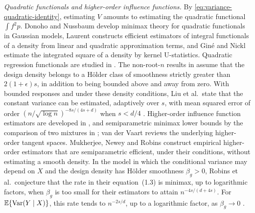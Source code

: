 \emph{Quadratic functionals and higher-order influence functions.} By
\eqref{eq:variance-quadratic-identity}, estimating $V$ amounts to
estimating the quadratic functional $\int f^2p$. Donoho and Nussbaum
\cite{DonohoNussbaum1990} develop minimax theory for quadratic
functionals in Gaussian models, Laurent \cite{Laurent1996} constructs
efficient estimators of integral functionals of a density from linear
and quadratic approximation terms, and Gin\'e and Nickl
\cite{GineNickl2008} estimate the integrated square of a density by
kernel U-statistics. Quadratic regression functionals are studied in
\cite{HuangFan1999,LiuEtAl2021}. The non-root-$n$ results in
\cite[Section~3.3]{LiuEtAl2021} assume that the design density belongs
to a H\"older class of smoothness strictly greater than
$2(1+\epsilon)s$, in addition to being bounded above and away from
zero. With bounded responses and under these density conditions, Liu
et al.\ state that the
constant variance can be estimated, adaptively over $s$, with mean
squared error of order $(n/\sqrt{\log n})^{-8s/(4s+d)}$ when $s<d/4$
\cite[Remark~3.5]{LiuEtAl2021}. Higher-order influence function
estimators are developed in
\cite{RobinsEtAl2008,RobinsEtAl2017}, and semiparametric minimax lower
bounds by the comparison of two mixtures in \cite{RobinsEtAl2009EJS};
van der Vaart \cite{vanDerVaart2014} reviews the underlying
higher-order tangent spaces. Mukherjee, Newey and Robins
\cite[Section~2.3]{MukherjeeNeweyRobins2017} construct empirical
higher-order estimators that are semiparametric efficient, under their
conditions, without estimating a smooth density. In the model in which
the conditional variance may depend on $X$ and the design density has
H\"older smoothness $\beta_g>0$, Robins et al.\ conjecture that the
rate in their equation~(1.3) is minimax, up to logarithmic factors,
when $\beta_g$ is too small for their estimators to attain
$n^{-4s/(d+4s)}$. For $\mathbb E\{\operatorname{Var}(Y\mid X)\}$, this rate tends to
$n^{-2s/d}$, up to a logarithmic factor, as $\beta_g\to0$
\cite[p.~338]{RobinsEtAl2008}.

